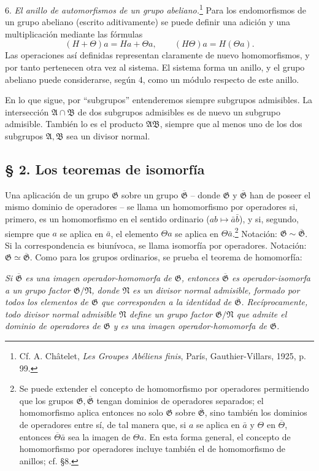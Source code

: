 \documentclass[11pt]{article}
\providecommand{\mG}{\mathfrak{G}}
\providecommand{\mA}{\mathfrak{A}}
\providecommand{\mB}{\mathfrak{B}}
\providecommand{\mN}{\mathfrak{N}}
\begin{document}
6. \emph{El anillo de automorfismos de un grupo abeliano.}\footnote{Cf. A. Châtelet, \emph{Les Groupes Abéliens finis}, París, Gauthier-Villars, 1925, p. 99.} Para los endomorfismos de un grupo abeliano (escrito aditivamente) se puede definir una adición y una multiplicación mediante las fórmulas
\[
        (H+\Theta)a=Ha+\Theta a,\qquad (H\Theta)a=H(\Theta a).
\]
Las operaciones así definidas representan claramente de nuevo homomorfismos, y por tanto pertenecen otra vez al sistema. El sistema forma un anillo, y el grupo abeliano puede considerarse, según 4, como un módulo respecto de este anillo.

En lo que sigue, por ``subgrupos'' entenderemos siempre subgrupos admisibles. La intersección $\mA\cap\mB$ de dos subgrupos admisibles es de nuevo un subgrupo admisible. También lo es el producto $\mA\mB$, siempre que al menos uno de los dos subgrupos $\mA,\mB$ sea un divisor normal.

\subsection*{§ 2. Los teoremas de isomorfía}

Una aplicación de un grupo $\mG$ sobre un grupo $\overline{\mG}$ -- donde $\mG$ y $\overline{\mG}$ han de poseer el mismo dominio de operadores -- se llama un homomorfismo por operadores si, primero, es un homomorfismo en el sentido ordinario ($ab\mapsto \bar a\bar b$), y si, segundo, siempre que $a$ se aplica en $\bar a$, el elemento $\Theta a$ se aplica en $\Theta\bar a$.\footnote{Se puede extender el concepto de homomorfismo por operadores permitiendo que los grupos $\mG,\overline{\mG}$ tengan dominios de operadores separados; el homomorfismo aplica entonces no solo $\mG$ sobre $\overline{\mG}$, sino también los dominios de operadores entre sí, de tal manera que, si $a$ se aplica en $\bar a$ y $\Theta$ en $\overline\Theta$, entonces $\overline\Theta\bar a$ sea la imagen de $\Theta a$. En esta forma general, el concepto de homomorfismo por operadores incluye también el de homomorfismo de anillos; cf. §8.} Notación: $\mG\sim\overline{\mG}$. Si la correspondencia es biunívoca, se llama isomorfía por operadores. Notación: $\mG\simeq\overline{\mG}$. Como para los grupos ordinarios, se prueba el teorema de homomorfía:

\emph{Si $\overline{\mG}$ es una imagen operador-homomorfa de $\mG$, entonces $\overline{\mG}$ es operador-isomorfa a un grupo factor $\mG/\mN$, donde $\mN$ es un divisor normal admisible, formado por todos los elementos de $\mG$ que corresponden a la identidad de $\overline{\mG}$. Recíprocamente, todo divisor normal admisible $\mN$ define un grupo factor $\mG/\mN$ que admite el dominio de operadores de $\mG$ y es una imagen operador-homomorfa de $\mG$.}
\end{document}
